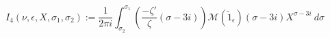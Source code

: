 \begin{definition}[I₄]
\label{I4}
\leanok
$$
  I_4(\nu, \epsilon, X, \sigma_1, \sigma_2) := \frac{1}{2\pi i} \int_{\sigma_2}^{\sigma_1}
  \left(
  \frac{-\zeta'}\zeta(\sigma - 3 i)
  \right)
    \mathcal M(\widetilde 1_\epsilon)(\sigma - 3 i)
  X^{\sigma - 3 i} \ d\sigma
  $$
\end{definition}
